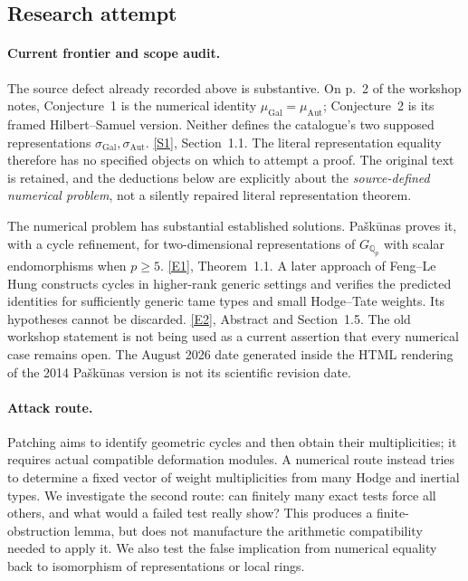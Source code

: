 \documentclass[11pt,a4paper]{article}
\newcommand{\Q}{\mathbb{Q}}
\newcommand{\sref}[2]{\hyperlink{source:#1:#2}{[S#2]}}
\newcommand{\eref}[2]{\hyperlink{extra:#1:#2}{[E#2]}}
\numberwithin{equation}{section}
\begin{document}
\subsection{Research attempt}

\paragraph{Current frontier and scope audit.}
The source defect already recorded above is substantive. On p.~2 of the
workshop notes, Conjecture~1 is the numerical identity
$\mu_{\mathrm{Gal}}=\mu_{\mathrm{Aut}}$; Conjecture~2 is its framed
Hilbert--Samuel version. Neither defines the catalogue's two supposed
representations $\sigma_{\mathrm{Gal}},\sigma_{\mathrm{Aut}}$.
\sref{228}{1}, Section~1.1. The literal representation equality therefore
has no specified objects on which to attempt a proof. The original text
is retained, and the deductions below are explicitly about the
\emph{source-defined numerical problem}, not a silently repaired literal
representation theorem.

The numerical problem has substantial established solutions. Pa\v{s}k\=unas
proves it, with a cycle refinement, for two-dimensional representations
of $G_{\Q_p}$ with scalar endomorphisms when $p\ge5$.
\eref{228}{1}, Theorem~1.1. A later approach of Feng--Le Hung constructs
cycles in higher-rank generic settings and verifies the predicted
identities for sufficiently generic tame types and small Hodge--Tate
weights. Its hypotheses cannot be discarded. \eref{228}{2}, Abstract
and Section~1.5. The old workshop statement is not being used as a
current assertion that every numerical case remains open. The August
2026 date generated inside the HTML rendering of the 2014 Pa\v{s}k\=unas
version is not its scientific revision date.

\paragraph{Attack route.}
Patching aims to identify geometric cycles and then obtain their
multiplicities; it requires actual compatible deformation modules.
A numerical route instead tries to determine a fixed vector of weight
multiplicities from many Hodge and inertial types. We investigate the
second route: can finitely many exact tests force all others, and what
would a failed test really show? This produces a finite-obstruction
lemma, but does not manufacture the arithmetic compatibility needed to
apply it. We also test the false implication from numerical equality
back to isomorphism of representations or local rings.
\end{document}
